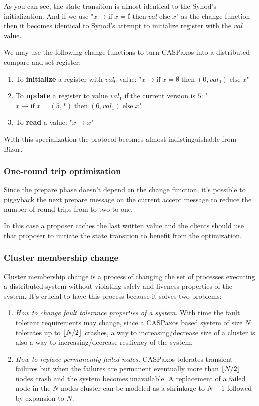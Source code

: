 \documentclass[12pt]{article}
\theoremstyle{definition}
\DeclarePairedDelimiter{\floor}{\lfloor}{\rfloor}
\begin{document}
As you can see, the state transition is almost identical to the Synod's initialization. And if we use "$x \to \mbox{if}\; x = \emptyset \;\mbox{then}\; val\; \mbox{else}\; x$" as the change function then it becomes identical to Synod's attempt to initialize register with the $val$ value.

We may use the following change functions to turn CASPaxos into a distributed compare and set register:
\begin{enumerate}
  \item To {\bf initialize} a register with $val_0$ value: "$x \to \mbox{if}\; x = \emptyset \;\mbox{then}\; (0, val_0)\; \mbox{else}\; x$"
  \item To {\bf update} a register to value $val_1$ if the current version is $5$: "$x \to \mbox{if}\; x = (5, \ast) \;\mbox{then}\; (6, val_1)\; \mbox{else}\; x$"
  \item To {\bf read} a value: "$x \to x$"
\end{enumerate}

With this specialization the protocol becomes almost indistinguishable from Bizur\cite{bizur}.

\subsubsection{One-round trip optimization}

Since the prepare phase doesn't depend on the change function, it's possible to piggyback the next prepare message on the current accept message to reduce the number of round trips from to two to one.

In this case a proposer caches the last written value and the clients should use that proposer to initiate the state transition to benefit from the optimization.

\subsubsection{Cluster membership change}

Cluster membership change is a process of changing the set of processes executing a distributed system without violating safely and liveness properties of the system. It's crucial to have this process because it solves two problems:

\begin{enumerate}
  \item {\it How to change fault tolerance properties of a system}. With time the fault tolerant requirements may change, since a CASPaxos based system of size $N$ tolerates up to $\floor{N/2}$ crashes, a way to increasing/decrease size of a cluster is also a way to increasing/decrease resiliency of the system.

  \item {\it How to replace permanently failed nodes.} CASPaxos tolerates transient failures but when the failures are permanent eventually more than $\floor{N/2}$ nodes crash and the system becomes unavailable. A replacement of a failed node in the $N$ nodes cluster can be modeled as a shrinkage to $N-1$ followed by expansion to $N$.
\end{enumerate}
\end{document}
